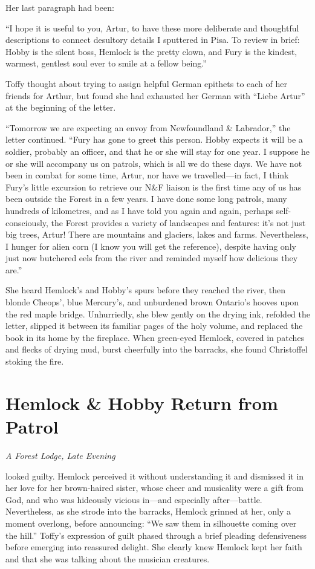 \documentclass[11pt,a5paper]{article}
\newcommand{\alet}[1]{\textit{#1}\vspace{1em}}
\begin{document}
Her last paragraph had been:

``I hope it is useful to you, Artur, to have these more deliberate and thoughtful descriptions to connect desultory details I sputtered in Pisa. To review in brief: Hobby is the silent boss, Hemlock is the pretty clown, and Fury is the kindest, warmest, gentlest soul ever to smile at a fellow being.''

Toffy thought about trying to assign helpful German epithets to each of her friends for Arthur, but found she had exhausted her German with ``Liebe Artur'' at the beginning of the letter.

``Tomorrow we are expecting an envoy from Newfoundland \& Labrador,'' the letter continued. ``Fury has gone to greet this person. Hobby expects it will be a soldier, probably an officer, and that he or she will stay for one year. I suppose he or she will accompany us on patrols, which is all we do these days. We have not been in combat for some time, Artur, nor have we travelled---in fact, I think Fury's little excursion to retrieve our N\&F liaison is the first time any of us has been outside the Forest in a few years. I have done some long patrols, many hundreds of kilometres, and as I have told you again and again, perhaps self-consciously, the Forest provides a variety of landscapes and features: it's not just big trees, Artur! There are mountains and glaciers, lakes and farms. Nevertheless, I hunger for alien corn (I know you will get the reference), despite having only just now butchered eels from the river and reminded myself how delicious they are.''

She heard Hemlock's and Hobby's spurs before they reached the river, then blonde Cheops', blue Mercury's, and unburdened brown Ontario's hooves upon the red maple bridge. Unhurriedly, she blew gently on the drying ink, refolded the letter, slipped it between its familiar pages of the holy volume, and replaced the book in its home by the fireplace. When green-eyed Hemlock, covered in patches and flecks of drying mud, burst cheerfully into the barracks, she found Christoffel stoking the fire.

\newpage

\section{Hemlock \& Hobby Return from Patrol}

\alet{A Forest Lodge, Late Evening}

 looked guilty. Hemlock perceived it without understanding it and dismissed it in her love for her brown-haired sister, whose cheer and musicality were a gift from God, and who was hideously vicious in---and especially after---battle. Nevertheless, as she strode into the barracks, Hemlock grinned at her, only a moment overlong, before announcing: ``We saw them in silhouette coming over the hill.'' Toffy's expression of guilt phased through a brief pleading defensiveness before emerging into reassured delight. She clearly knew Hemlock kept her faith and that she was talking about the musician creatures.
\end{document}
